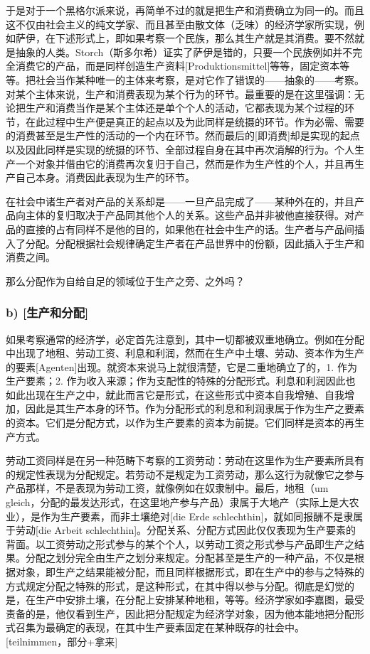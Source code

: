 \documentclass[a4paper,twoside,12pt]{ctexart}
\begin{document}
于是对于一个黑格尔派来说，再简单不过的就是把生产和消费确立为同一的。而且这不仅由社会主义的纯文学家、而且甚至由散文体（乏味）的经济学家所实现，例如萨伊，在下述形式上，即如果考察一个民族，那么其生产就是其消费。要不然就是抽象的人类。Storch（斯多尔希）证实了萨伊是错的，只要一个民族例如并不完全消费它的产品，而是同样创造生产资料[Produktionsmittel]等等，固定资本等等。把社会当作某种唯一的主体来考察，是对它作了错误的——抽象的——考察。对某个主体来说，生产和消费表现为某个行为的环节。最重要的是在这里强调：无论把生产和消费当作是某个主体还是单个个人的活动，它都表现为某个过程的环节，在此过程中生产便是真正的起点以及为此同样是统摄的环节。作为必需、需要的消费甚至是生产性的活动的一个内在环节。然而最后的[即消费]却是实现的起点以及因此同样是实现的统摄的环节、全部过程自身在其中再次消解的行为。个人生产一个对象并借由它的消费再次复归于自己，然而是作为生产性的个人，并且再生产自己本身。消费因此表现为生产的环节。

在社会中诸生产者对产品的关系却是——一旦产品完成了——某种外在的，并且产品向主体的复归取决于产品同其他个人的关系。这些产品并非被他直接获得。对产品的直接的占有同样不是他的目的，如果他在社会中生产的话。生产者与产品间插入了分配。分配根据社会规律确定生产者在产品世界中的份额，因此插入于生产和消费之间。

那么分配作为自给自足的领域位于生产之旁、之外吗？

\subsubsection{b) [生产和分配]}
如果考察通常的经济学，必定首先注意到，其中一切都被双重地确立。例如在分配中出现了地租、劳动工资、利息和利润，然而在生产中土壤、劳动、资本作为生产的要素[Agenten]出现。就资本来说马上就很清楚，它是二重地确立了的，1. 作为生产要素；2. 作为收入来源；作为支配性的特殊的分配形式。利息和利润因此也如此出现在生产之中，就此而言它是形式，在这些形式中资本自我增殖、自我增加，因此是其生产本身的环节。作为分配形式的利息和利润隶属于作为生产之要素的资本。它们是分配方式，以作为生产要素的资本为前提。它们同样是资本的再生产方式。

劳动工资同样是在另一种范畴下考察的工资劳动：劳动在这里作为生产要素所具有的规定性表现为分配规定。若劳动不是规定为工资劳动，那么这行为就像它之参与产品那样，不是表现为劳动工资，就像例如在奴隶制中。最后，地租（um gleich，分配的最发达形式，在这里地产参与产品）隶属于大地产（实际上是大农业），是作为生产要素，而非土壤绝对[die Erde schlechthin]，就如同报酬不是隶属于劳动[die Arbeit schlechthin]。分配关系、分配方式因此仅仅表现为生产要素的背面。以工资劳动之形式参与的某个个人，以劳动工资之形式参与产品即生产之结果。分配之划分完全由生产之划分来规定。分配甚至是生产的一种产品，不仅是根据对象，即生产之结果能被分配，而且同样根据形式，即在生产中的参与之特殊的方式规定分配之特殊的形式，是这种形式，在其中得以参与分配。彻底是幻觉的是，在生产中安排土壤，在分配上安排某种地租，等等。经济学家如李嘉图，最受责备的是，他仅看到生产，因此把分配规定为经济学对象，因为他本能地把分配形式召集为最确定的表现，在其中生产要素固定在某种既存的社会中。[teilnimmen，部分+拿来]
\end{document}

